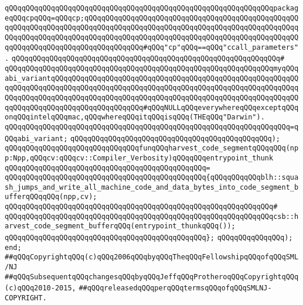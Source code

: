 \verb|qQQqqQQqqQQqqQQqqQQqqQQqqQQqqQQqqQQqqQQqqQQqqQQqqQQqqQQqqQQqqQQqpackageqQQqcpqQQq=qQQqcp;qQQqqQQqqQQqqQQqqQQqqQQqqQQqqQQqqQQqqQQqqQQqqQQqqQQqqQQqqQQqqQQqqQQqqQQqqQQqqQQqqQQqqQQqqQQqqQQqqQQqqQQqqQQqqQQqqQQqqQQqqQQqqQQqqQQqqQQqqQQqqQQqqQQqqQQqqQQqqQQqqQQqqQQqqQQqqQQqqQQqqQQqqQQqqQQqqQQqqQQqqQQqqQQqqQQqqQQqqQQqqQQq#qQQq"cp"qQQq==qQQq"ccall_parameters".|\newline
\verb|qQQqqQQqqQQqqQQqqQQqqQQqqQQqqQQqqQQqqQQqqQQqqQQqqQQqqQQqqQQqqQQq#|\newline
\verb|qQQqqQQqqQQqqQQqqQQqqQQqqQQqqQQqqQQqqQQqqQQqqQQqqQQqqQQqqQQqqQQqmyqQQqabi_variantqQQqqQQqqQQqqQQqqQQqqQQqqQQqqQQqqQQqqQQqqQQqqQQqqQQqqQQqqQQqqQQqqQQqqQQqqQQqqQQqqQQqqQQqqQQqqQQqqQQqqQQqqQQqqQQqqQQqqQQqqQQqqQQqqQQqqQQqqQQqqQQqqQQqqQQqqQQqqQQqqQQqqQQqqQQqqQQqqQQqqQQqqQQqqQQqqQQqqQQqqQQqqQQqqQQqqQQqqQQqqQQqqQQqqQQq#qQQqNULLqQQqeverywhereqQQqexceptqQQqonqQQqintelqQQqmac,qQQqwhereqQQqitqQQqisqQQq(THEqQQq"Darwin").|\newline
\verb|qQQqqQQqqQQqqQQqqQQqqQQqqQQqqQQqqQQqqQQqqQQqqQQqqQQqqQQqqQQqqQQqqQQq=qQQqabi_variant;|\newline
\verb|qQQqqQQqqQQqqQQqqQQqqQQqqQQqqQQqqQQqqQQqqQQqqQQq);|\newline
\newline
\verb|qQQqqQQqqQQqqQQqqQQqqQQqqQQqqQQqfunqQQqharvest_code_segmentqQQqqQQq(npp:Npp,qQQqcv:qQQqcv::Compiler_Verbosity)qQQqqQQqentrypoint_thunk|\newline
\verb|qQQqqQQqqQQqqQQqqQQqqQQqqQQqqQQqqQQqqQQqqQQqqQQq=|\newline
\verb|qQQqqQQqqQQqqQQqqQQqqQQqqQQqqQQqqQQqqQQqqQQqqQQq{qQQqqQQqqQQqblh::squash_jumps_and_write_all_machine_code_and_data_bytes_into_code_segment_bufferqQQqqQQq(npp,cv);|\newline
\verb|qQQqqQQqqQQqqQQqqQQqqQQqqQQqqQQqqQQqqQQqqQQqqQQqqQQqqQQqqQQqqQQq#|\newline
\verb|qQQqqQQqqQQqqQQqqQQqqQQqqQQqqQQqqQQqqQQqqQQqqQQqqQQqqQQqqQQqqQQqcsb::harvest_code_segment_bufferqQQq(entrypoint_thunkqQQq());|\newline
\verb|qQQqqQQqqQQqqQQqqQQqqQQqqQQqqQQqqQQqqQQqqQQqqQQq};|\newline
\verb|qQQqqQQqqQQqqQQq);|\newline
\verb|end;|\newline
\newline
\verb|##qQQqCopyrightqQQq(c)qQQq2006qQQqbyqQQqTheqQQqFellowshipqQQqofqQQqSML/NJ|\newline
\verb|##qQQqSubsequentqQQqchangesqQQqbyqQQqJeffqQQqProtheroqQQqCopyrightqQQq(c)qQQq2010-2015,|\newline
\verb|##qQQqreleasedqQQqperqQQqtermsqQQqofqQQqSMLNJ-COPYRIGHT.|\newline

